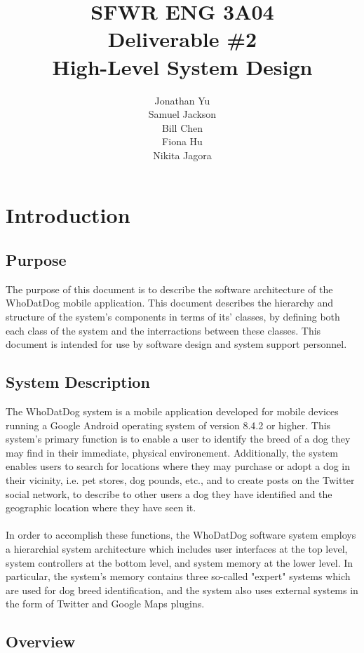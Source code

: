 \documentclass[]{article}
\title{SFWR ENG 3A04\\Deliverable \#2\\High-Level System Design}
\author{Jonathan Yu\\Samuel Jackson\\Bill Chen\\Fiona Hu\\Nikita Jagora}
\date{}
\begin{document}
\maketitle	

\section{Introduction}
\label{sec:introduction}

\subsection{Purpose}
\label{sec:purpose}

The purpose of this document is to describe the software architecture of the WhoDatDog mobile application. This document describes the hierarchy and structure of the system's components in terms of its' classes, by defining both each class of the system and the interractions between these classes. This document is intended for use by software design and system support personnel.

\subsection{System Description}
\label{sec:sysdescription}

The WhoDatDog system is a mobile application developed for mobile devices running a Google Android operating system of version 8.4.2 or higher. This system's primary function is to enable a user to identify the breed of a dog they may find in their immediate, physical environement. Additionally, the system enables users to search for locations where they may purchase or adopt a dog in their vicinity, i.e. pet stores, dog pounds, etc., and to create posts on the Twitter social network, to describe to other users a dog they have identified and the geographic location where they have seen it.\\\\In order to accomplish these functions, the WhoDatDog software system employs a hierarchial system architecture which includes user interfaces at the top level, system controllers at the bottom level, and system memory at the lower level. In particular, the system's memory contains three so-called "expert" systems which are used for dog breed identification, and the system also uses external systems in the form of Twitter and Google Maps plugins.

\subsection{Overview}
\label{sec:overview}
\end{document}
